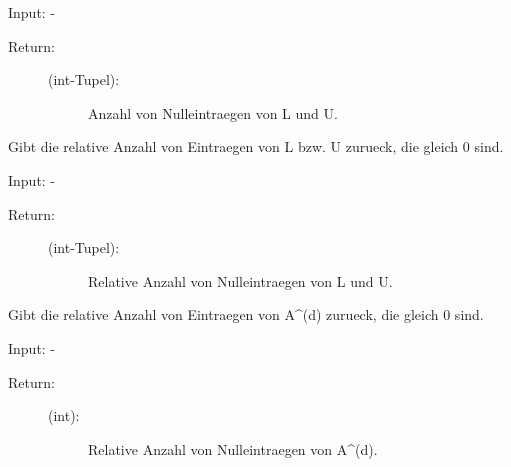 \documentclass[letterpaper,10pt,ngerman]{sphinxmanual}
\begin{document}
\begin{fulllineitems}
\begin{fulllineitems}
Input: -
\begin{description}
\item[{Return:}] \leavevmode\begin{description}
\item[{(int-Tupel):}] \leavevmode
Anzahl von Nulleintraegen von L und U.

\end{description}

\end{description}

\end{fulllineitems}


\begin{fulllineitems}
\label{\detokenize{index:sparse_erw.Sparse.anz_n_lu_rel}}
Gibt die relative Anzahl von Eintraegen von L bzw. U zurueck, die gleich 0 sind.

Input: -
\begin{description}
\item[{Return:}] \leavevmode\begin{description}
\item[{(int-Tupel):}] \leavevmode
Relative Anzahl von Nulleintraegen von L und U.

\end{description}

\end{description}

\end{fulllineitems}


\begin{fulllineitems}
\label{\detokenize{index:sparse_erw.Sparse.anz_n_rel}}
Gibt die relative Anzahl von Eintraegen von A\textasciicircum{}(d) zurueck, die gleich 0 sind.

Input: -
\begin{description}
\item[{Return:}] \leavevmode\begin{description}
\item[{(int):}] \leavevmode
Relative Anzahl von Nulleintraegen von A\textasciicircum{}(d).

\end{description}


\end{description}
\end{fulllineitems}
\end{fulllineitems}
\end{document}
